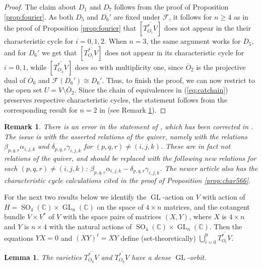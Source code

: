 \documentclass[11pt,reqno]{amsart}
\newcommand{\C}{\mathbb{C}}
\newcommand{\GL}{\operatorname{GL}}
\newcommand{\mc}[1]{\mathcal{#1}}
\newcommand{\ol}[1]{\overline{#1}}
\newcommand{\op}[1]{\operatorname{#1}}
\newtheorem{lemma}[theorem]{Lemma}
\newtheorem{remark}[theorem]{Remark}
\numberwithin{equation}{section}
\begin{document}
\begin{proof}
The claim about $D_1$ and $D_7$ follows from the proof of Proposition \ref{prop:fourier}. As both $D_5$ and $D_6'$ are fixed under $\mc{F}$, it follows for $n\geq 4$ as in the proof of Proposition \ref{prop:fourier} that $[\overline{T^{\ast}_{O_i}V}]$ does not appear in the their characteristic cycle for $i=0,1,2$. When $n=3$, the same argument works for $D_5$, and for $D_6'$ we get that $[\overline{T^{\ast}_{O_i}V}]$ does not appear in its characteristic cycle for $i=0,1$, while $[\overline{T^{\ast}_{O_2}V}]$ does so with multiplicity one, since $\ol{O}_2$ is the projective dual of $\ol{O}_6$ and $\mc{F}(D_6')\cong D_6'$. Thus, to finish the proof, we can now restrict to the open set $U=V\setminus \ol{O}_2$. Since the chain of equivalences in (\ref{eq:catchain}) preserves respective characteristic cycles, the statement follows from the corresponding result for $n=2$ in \cite[Theorem 3.4]{perlmancorrected} (see Remark \ref{rem:mikeerror}).
\end{proof}

\begin{remark}\label{rem:mikeerror}
There is an error in the statement of \cite[Theorem on the Quiver Structure]{perlman2020equivariant}, which has been corrected in \cite{perlmancorrected}. The issue is with the asserted relations of the quiver, namely with the relations $\beta_{p,q,r}\alpha_{i,j,k}$ and $\delta_{p,q,r}\gamma_{i,j,k}$ for $(p,q,r)\neq (i,j,k)$. These are in fact not relations of the quiver, and should be replaced with the following new relations for each $(p,q,r)\neq (i,j,k)$: $\beta_{p,q,r}\alpha_{i,j,k}-\delta_{p,q,r}\gamma_{i,j,k}$. The newer article \cite{perlmancorrected} also has the characteristic cycle calculations cited in the proof of Proposition \ref{prop:char566}.
\end{remark}


For the next two results below we identify the $\GL$-action on $V$ with action of $H=\op{SO}_4(\C) \times \GL_n(\C)$ on the space of $4\times n$ matrices, and the cotangent bundle $V \times V^*$ of $V$ with the space pairs of matrices $(X, Y)$, where $X$ is $4\times n$ and $Y$ is $n\times 4$ with the natural actions of $\op{SO}_4(\C) \times \GL_n(\C)$. Then the equations $YX = 0$ and $(XY)^t = XY$ define (set-theoretically)  $\bigcup_{i=0}^9  \ol{T_{O_i}^* V}$.


\begin{lemma}\label{lem:dense}
The varieties $\ol{T_{O_6}^* V}$ and $\ol{T_{O_8}^* V}$ have a dense $\GL$-orbit.
\end{lemma}
\end{document}
